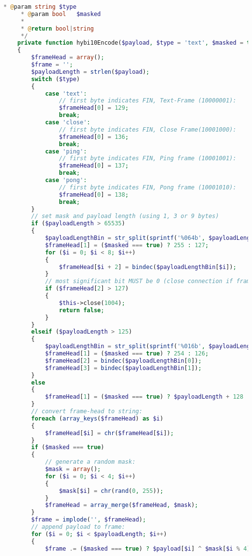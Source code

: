 \begin{lstlisting}[language=PHP]
     * @param string $type
     * @param bool   $masked
     *
     * @return bool|string
     */
    private function hybi10Encode($payload, $type = 'text', $masked = true)
    {
        $frameHead = array();
        $frame = '';
        $payloadLength = strlen($payload);
        switch ($type)
        {
            case 'text':
                // first byte indicates FIN, Text-Frame (10000001):
                $frameHead[0] = 129;
                break;
            case 'close':
                // first byte indicates FIN, Close Frame(10001000):
                $frameHead[0] = 136;
                break;
            case 'ping':
                // first byte indicates FIN, Ping frame (10001001):
                $frameHead[0] = 137;
                break;
            case 'pong':
                // first byte indicates FIN, Pong frame (10001010):
                $frameHead[0] = 138;
                break;
        }
        // set mask and payload length (using 1, 3 or 9 bytes)
        if ($payloadLength > 65535)
        {
            $payloadLengthBin = str_split(sprintf('%064b', $payloadLength), 8);
            $frameHead[1] = ($masked === true) ? 255 : 127;
            for ($i = 0; $i < 8; $i++)
            {
                $frameHead[$i + 2] = bindec($payloadLengthBin[$i]);
            }
            // most significant bit MUST be 0 (close connection if frame too big)
            if ($frameHead[2] > 127)
            {
                $this->close(1004);
                return false;
            }
        }
        elseif ($payloadLength > 125)
        {
            $payloadLengthBin = str_split(sprintf('%016b', $payloadLength), 8);
            $frameHead[1] = ($masked === true) ? 254 : 126;
            $frameHead[2] = bindec($payloadLengthBin[0]);
            $frameHead[3] = bindec($payloadLengthBin[1]);
        }
        else
        {
            $frameHead[1] = ($masked === true) ? $payloadLength + 128 : $payloadLength;
        }
        // convert frame-head to string:
        foreach (array_keys($frameHead) as $i)
        {
            $frameHead[$i] = chr($frameHead[$i]);
        }
        if ($masked === true)
        {
            // generate a random mask:
            $mask = array();
            for ($i = 0; $i < 4; $i++)
            {
                $mask[$i] = chr(rand(0, 255));
            }
            $frameHead = array_merge($frameHead, $mask);
        }
        $frame = implode('', $frameHead);
        // append payload to frame:
        for ($i = 0; $i < $payloadLength; $i++)
        {
            $frame .= ($masked === true) ? $payload[$i] ^ $mask[$i % 4] : $payload[$i];

\end{lstlisting}
